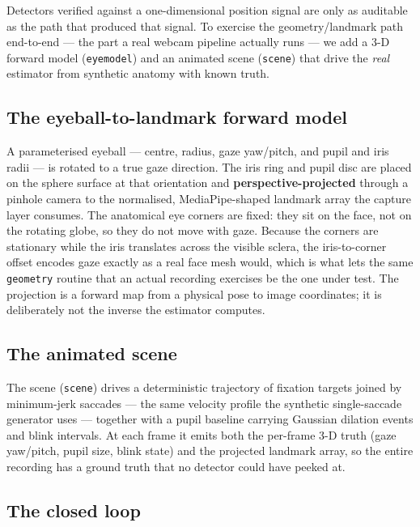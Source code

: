 \documentclass[
]{article}
\begin{document}
Detectors verified against a one-dimensional position signal are only as
auditable as the path that produced that signal. To exercise the
geometry/landmark path end-to-end --- the part a real webcam pipeline
actually runs --- we add a 3-D forward model (\texttt{eyemodel}) and an
animated scene (\texttt{scene}) that drive the \emph{real} estimator
from synthetic anatomy with known truth.

\subsection{The eyeball-to-landmark forward
model}\label{the-eyeball-to-landmark-forward-model}

A parameterised eyeball --- centre, radius, gaze yaw/pitch, and pupil
and iris radii --- is rotated to a true gaze direction. The iris ring
and pupil disc are placed on the sphere surface at that orientation and
\textbf{perspective-projected} through a pinhole camera to the
normalised, MediaPipe-shaped landmark array the capture layer consumes.
The anatomical eye corners are fixed: they sit on the face, not on the
rotating globe, so they do not move with gaze. Because the corners are
stationary while the iris translates across the visible sclera, the
iris-to-corner offset encodes gaze exactly as a real face mesh would,
which is what lets the same \texttt{geometry} routine that an actual
recording exercises be the one under test. The projection is a forward
map from a physical pose to image coordinates; it is deliberately not
the inverse the estimator computes.

\subsection{The animated scene}\label{the-animated-scene}

The scene (\texttt{scene}) drives a deterministic trajectory of fixation
targets joined by minimum-jerk saccades --- the same velocity profile
the synthetic single-saccade generator uses --- together with a pupil
baseline carrying Gaussian dilation events and blink intervals. At each
frame it emits both the per-frame 3-D truth (gaze yaw/pitch, pupil size,
blink state) and the projected landmark array, so the entire recording
has a ground truth that no detector could have peeked at.

\subsection{The closed loop}\label{the-closed-loop}
\end{document}

